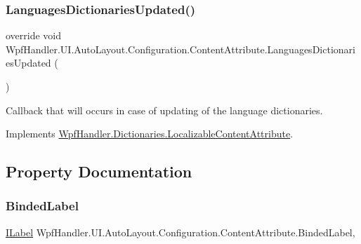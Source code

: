 \subsubsection{\texorpdfstring{Languages\+Dictionaries\+Updated()}{LanguagesDictionariesUpdated()}}
{\footnotesize\ttfamily override void Wpf\+Handler.\+U\+I.\+Auto\+Layout.\+Configuration.\+Content\+Attribute.\+Languages\+Dictionaries\+Updated (\begin{DoxyParamCaption}{ }\end{DoxyParamCaption})\hspace{0.3cm}{\ttfamily [virtual]}}



Callback that will occurs in case of updating of the language dictionaries. 



Implements \mbox{\hyperlink{class_wpf_handler_1_1_dictionaries_1_1_localizable_content_attribute_a001e110c7ad42422bc02a44d9eedc801}{Wpf\+Handler.\+Dictionaries.\+Localizable\+Content\+Attribute}}.



\subsection{Property Documentation}
\mbox{\label{class_wpf_handler_1_1_u_i_1_1_auto_layout_1_1_configuration_1_1_content_attribute_a27ac4fe8d5fdf953c624a099b7c33ac4}} 
\subsubsection{\texorpdfstring{Binded\+Label}{BindedLabel}}
{\footnotesize\ttfamily \mbox{\hyperlink{interface_wpf_handler_1_1_u_i_1_1_controls_1_1_i_label}{I\+Label}} Wpf\+Handler.\+U\+I.\+Auto\+Layout.\+Configuration.\+Content\+Attribute.\+Binded\+Label\hspace{0.3cm}{\ttfamily [get]}, {}}



